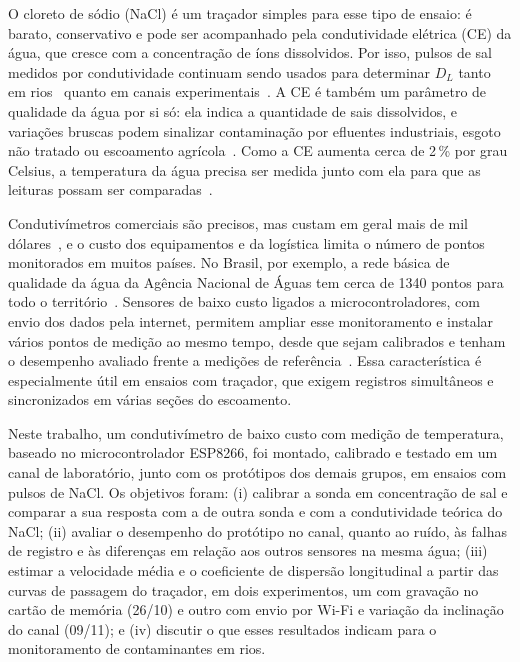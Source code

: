 \documentclass[12pt,a4paper]{article}
\begin{document}
O cloreto de sódio (NaCl) é um traçador simples para esse tipo de ensaio: é barato, conservativo e pode ser acompanhado pela condutividade elétrica (CE) da água, que cresce com a concentração de íons dissolvidos. Por isso, pulsos de sal medidos por condutividade continuam sendo usados para determinar $D_L$ tanto em rios~\cite{castillo2022} quanto em canais experimentais~\cite{vastila2022}. A CE é também um parâmetro de qualidade da água por si só: ela indica a quantidade de sais dissolvidos, e variações bruscas podem sinalizar contaminação por efluentes industriais, esgoto não tratado ou escoamento agrícola~\cite{grochocki2025,visco2023}. Como a CE aumenta cerca de 2\,\% por grau Celsius, a temperatura da água precisa ser medida junto com ela para que as leituras possam ser comparadas~\cite{hayashi2004}.

Condutivímetros comerciais são precisos, mas custam em geral mais de mil dólares~\cite{grochocki2025}, e o custo dos equipamentos e da logística limita o número de pontos monitorados em muitos países. No Brasil, por exemplo, a rede básica de qualidade da água da Agência Nacional de Águas tem cerca de 1340 pontos para todo o território~\cite{camargo2023}. Sensores de baixo custo ligados a microcontroladores, com envio dos dados pela internet, permitem ampliar esse monitoramento e instalar vários pontos de medição ao mesmo tempo, desde que sejam calibrados e tenham o desempenho avaliado frente a medições de referência~\cite{camargo2023,visco2023}. Essa característica é especialmente útil em ensaios com traçador, que exigem registros simultâneos e sincronizados em várias seções do escoamento.

Neste trabalho, um condutivímetro de baixo custo com medição de temperatura, baseado no microcontrolador ESP8266, foi montado, calibrado e testado em um canal de laboratório, junto com os protótipos dos demais grupos, em ensaios com pulsos de NaCl. Os objetivos foram: (i) calibrar a sonda em concentração de sal e comparar a sua resposta com a de outra sonda e com a condutividade teórica do NaCl; (ii) avaliar o desempenho do protótipo no canal, quanto ao ruído, às falhas de registro e às diferenças em relação aos outros sensores na mesma água; (iii) estimar a velocidade média e o coeficiente de dispersão longitudinal a partir das curvas de passagem do traçador, em dois experimentos, um com gravação no cartão de memória (26/10) e outro com envio por Wi-Fi e variação da inclinação do canal (09/11); e (iv) discutir o que esses resultados indicam para o monitoramento de contaminantes em rios.
\end{document}
